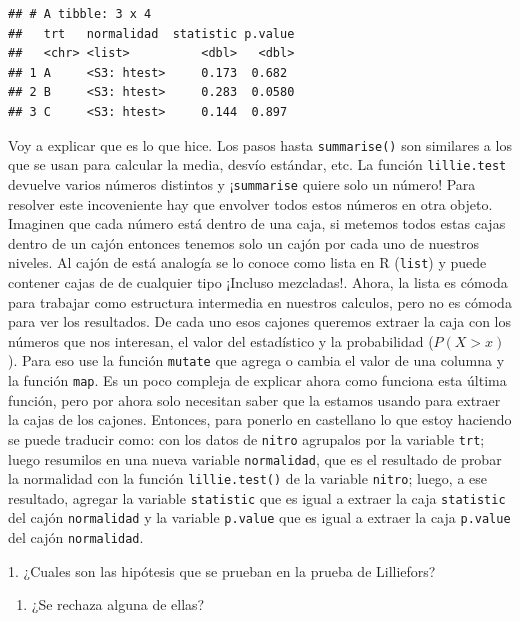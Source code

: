 \documentclass[]{book}
\providecommand{\tightlist}{%
  \setlength{\itemsep}{0pt}\setlength{\parskip}{0pt}}
\theoremstyle{definition}
\theoremstyle{definition}
\theoremstyle{definition}
\theoremstyle{remark}
\let\BeginKnitrBlock\begin \let\EndKnitrBlock\end
\begin{document}
\begin{verbatim}
## # A tibble: 3 x 4
##   trt   normalidad  statistic p.value
##   <chr> <list>          <dbl>   <dbl>
## 1 A     <S3: htest>     0.173  0.682 
## 2 B     <S3: htest>     0.283  0.0580
## 3 C     <S3: htest>     0.144  0.897
\end{verbatim}

Voy a explicar que es lo que hice. Los pasos hasta \texttt{summarise()}
son similares a los que se usan para calcular la media, desvío estándar,
etc. La función \texttt{lillie.test} devuelve varios números distintos y
¡\texttt{summarise} quiere solo un número! Para resolver este
incoveniente hay que envolver todos estos números en otra objeto.
Imaginen que cada número está dentro de una caja, si metemos todos estas
cajas dentro de un cajón entonces tenemos solo un cajón por cada uno de
nuestros niveles. Al cajón de está analogía se lo conoce como lista en R
(\texttt{list}) y puede contener cajas de de cualquier tipo ¡Incluso
mezcladas!. Ahora, la lista es cómoda para trabajar como estructura
intermedia en nuestros calculos, pero no es cómoda para ver los
resultados. De cada uno esos cajones queremos extraer la caja con los
números que nos interesan, el valor del estadístico y la probabilidad
(\(P(X>x)\)). Para eso use la función \texttt{mutate} que agrega o
cambia el valor de una columna y la función \texttt{map}. Es un poco
compleja de explicar ahora como funciona esta última función, pero por
ahora solo necesitan saber que la estamos usando para extraer la cajas
de los cajones. Entonces, para ponerlo en castellano lo que estoy
haciendo se puede traducir como: con los datos de \texttt{nitro}
agrupalos por la variable \texttt{trt}; luego resumilos en una nueva
variable \texttt{normalidad}, que es el resultado de probar la
normalidad con la función \texttt{lillie.test()} de la variable
\texttt{nitro}; luego, a ese resultado, agregar la variable
\texttt{statistic} que es igual a extraer la caja \texttt{statistic} del
cajón \texttt{normalidad} y la variable \texttt{p.value} que es igual a
extraer la caja \texttt{p.value} del cajón \texttt{normalidad}.

\BeginKnitrBlock{exercise}
\protect\hypertarget{exr:unnamed-chunk-8}{}{\label{exr:unnamed-chunk-8} }1.
¿Cuales son las hipótesis que se prueban en la prueba de Lilliefors?

\begin{enumerate}
\def\labelenumi{\arabic{enumi}.}
\setcounter{enumi}{1}
\tightlist
\item
  ¿Se rechaza alguna de ellas?
\end{enumerate}
\EndKnitrBlock{exercise}
\end{document}
